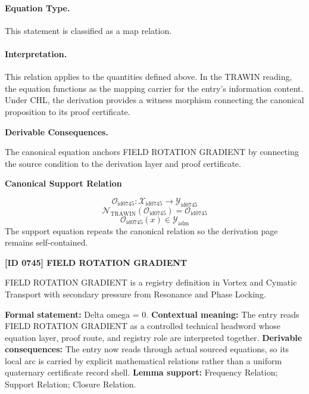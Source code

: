 \paragraph{Equation Type.}
This statement is classified as a map relation.

\paragraph{Interpretation.}
This relation applies to the quantities defined above. In the TRAWIN reading, the equation functions as the mapping carrier for the entry’s information content. Under CHL, the derivation provides a witness morphism connecting the canonical proposition to its proof certificate.

\par\vspace{0.35em}
\noindent\textbf{Derivable Consequences.}\quad
\begingroup
\footnotesize
\raggedright
The canonical equation anchors FIELD ROTATION GRADIENT by connecting the source condition to the derivation layer and proof certificate.
\par\endgroup

\noindent\textbf{Canonical Support Relation}\par
\[
\mathcal{O}_{\mathrm{id0745}}:\mathcal{X}_{\mathrm{id0745}}\longrightarrow\mathcal{Y}_{\mathrm{id0745}}
\]
\[
\mathcal{N}_{\mathrm{TRAWIN}}(\mathcal{O}_{\mathrm{id0745}})=\mathcal{O}_{\mathrm{id0745}}
\]
\[
\mathcal{O}_{\mathrm{id0745}}(x)\in\mathcal{Y}_{\mathrm{adm}}
\]
\noindent The support equation repeats the canonical relation so the derivation page remains self-contained.\par

\clearpage
\noindent\textbf{[ID 0745] FIELD ROTATION GRADIENT}\par
\vspace{0.35em}
\begingroup\small
{}
FIELD ROTATION GRADIENT is a registry definition in Vortex and Cymatic Transport with secondary pressure from Resonance and Phase Locking.

\begingroup\footnotesize\setlength{\emergencystretch}{3em}\sloppy
\textbf{Formal statement:} Delta omega = 0. \textbf{Contextual meaning:} The entry reads FIELD ROTATION GRADIENT as a controlled technical headword whose equation layer, proof route, and registry role are interpreted together. \textbf{Derivable consequences:} The entry now reads through actual sourced equations, so its local arc is carried by explicit mathematical relations rather than a uniform quaternary certificate record shell. \textbf{Lemma support:} Frequency Relation; Support Relation; Closure Relation.\par
\endgroup

